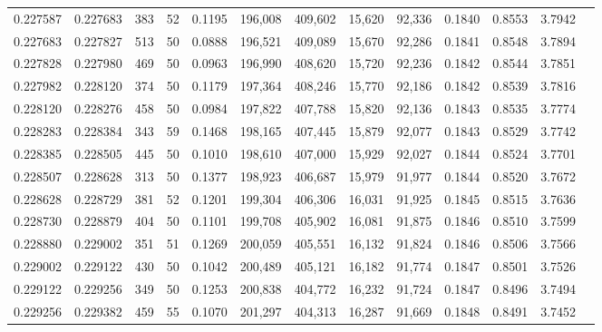 \begin{tabular}{rrrrrrrrrrrrr}
0.227587 & 0.227683 &   383 &  52 &                                     0.1195 & 196,008 & 409,602 &  15,620 &  92,336 & 0.1840 & 0.8553 & 3.7942 \\
0.227683 & 0.227827 &   513 &  50 &                                     0.0888 & 196,521 & 409,089 &  15,670 &  92,286 & 0.1841 & 0.8548 & 3.7894 \\
0.227828 & 0.227980 &   469 &  50 &                                     0.0963 & 196,990 & 408,620 &  15,720 &  92,236 & 0.1842 & 0.8544 & 3.7851 \\
0.227982 & 0.228120 &   374 &  50 &                                     0.1179 & 197,364 & 408,246 &  15,770 &  92,186 & 0.1842 & 0.8539 & 3.7816 \\
0.228120 & 0.228276 &   458 &  50 &                                     0.0984 & 197,822 & 407,788 &  15,820 &  92,136 & 0.1843 & 0.8535 & 3.7774 \\
0.228283 & 0.228384 &   343 &  59 &                                     0.1468 & 198,165 & 407,445 &  15,879 &  92,077 & 0.1843 & 0.8529 & 3.7742 \\
0.228385 & 0.228505 &   445 &  50 &                                     0.1010 & 198,610 & 407,000 &  15,929 &  92,027 & 0.1844 & 0.8524 & 3.7701 \\
0.228507 & 0.228628 &   313 &  50 &                                     0.1377 & 198,923 & 406,687 &  15,979 &  91,977 & 0.1844 & 0.8520 & 3.7672 \\
0.228628 & 0.228729 &   381 &  52 &                                     0.1201 & 199,304 & 406,306 &  16,031 &  91,925 & 0.1845 & 0.8515 & 3.7636 \\
0.228730 & 0.228879 &   404 &  50 &                                     0.1101 & 199,708 & 405,902 &  16,081 &  91,875 & 0.1846 & 0.8510 & 3.7599 \\
0.228880 & 0.229002 &   351 &  51 &                                     0.1269 & 200,059 & 405,551 &  16,132 &  91,824 & 0.1846 & 0.8506 & 3.7566 \\
0.229002 & 0.229122 &   430 &  50 &                                     0.1042 & 200,489 & 405,121 &  16,182 &  91,774 & 0.1847 & 0.8501 & 3.7526 \\
0.229122 & 0.229256 &   349 &  50 &                                     0.1253 & 200,838 & 404,772 &  16,232 &  91,724 & 0.1847 & 0.8496 & 3.7494 \\
0.229256 & 0.229382 &   459 &  55 &                                     0.1070 & 201,297 & 404,313 &  16,287 &  91,669 & 0.1848 & 0.8491 & 3.7452 \\

\end{tabular}

